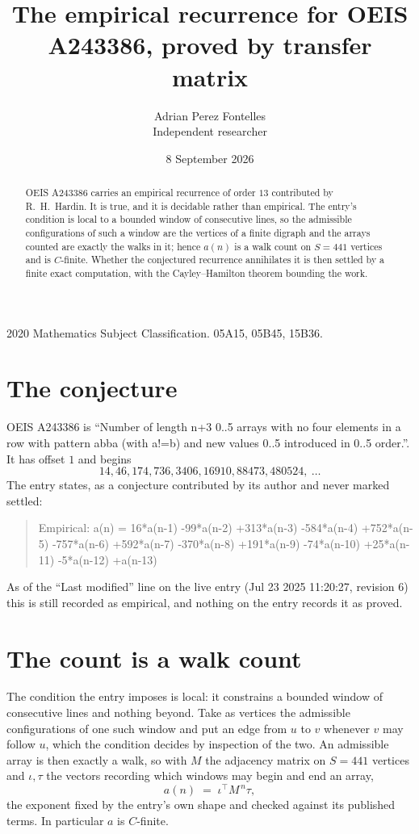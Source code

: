 \documentclass[11pt,a4paper]{article}
\title{The empirical recurrence for OEIS A243386, proved by transfer matrix}
\author{Adrian Perez Fontelles\\ \small Independent researcher}
\date{8 September 2026}
\theoremstyle{plain}
\theoremstyle{definition}
\begin{document}
\maketitle

\begin{abstract}
OEIS A243386 carries an empirical recurrence of order $13$ contributed by R.~H.~Hardin. It is
true, and it is decidable rather than empirical. The entry's condition is local to a bounded window of consecutive lines, so
the admissible configurations of such a window are the vertices of a finite digraph and the
arrays counted are exactly the walks in it; hence $a(n)$ is a walk count on $S=441$ vertices
and is $C$-finite. Whether the conjectured recurrence annihilates it is then settled by a
finite exact computation, with the Cayley--Hamilton theorem bounding the work.
\end{abstract}

\noindent\small 2020 Mathematics Subject Classification. 05A15, 05B45, 15B36.\normalsize

\section{The conjecture}

OEIS A243386 is ``Number of length n+3 0..5 arrays with no four elements in a row with pattern abba (with a!=b) and new values 0..5 introduced in 0..5 order.''. It has offset $1$ and begins
\[
14, 46, 174, 736, 3406, 16910, 88473, 480524,\ \dots
\]
The entry states, as a conjecture contributed by its author and never marked settled:
\begin{quote}
Empirical: a(n) = 16*a(n-1) -99*a(n-2) +313*a(n-3) -584*a(n-4) +752*a(n-5) -757*a(n-6) +592*a(n-7) -370*a(n-8) +191*a(n-9) -74*a(n-10) +25*a(n-11) -5*a(n-12) +a(n-13)
\end{quote}
As of the ``Last modified'' line on the live entry (Jul 23 2025 11:20:27, revision 6) this is still
recorded as empirical, and nothing on the entry records it as proved.

\section{The count is a walk count}

The condition the entry imposes is local: it constrains a bounded window of consecutive lines and nothing beyond. Take as
vertices the admissible configurations of one such window and put an edge from $u$ to $v$
whenever $v$ may follow $u$, which the condition decides by inspection of the two. An
admissible array is then exactly a walk, so with $M$ the adjacency matrix on $S=441$ vertices
and $\iota,\tau$ the vectors recording which windows may begin and end an array,
\[
a(n)\;=\;\iota^{\!\top}M^{\,n}\tau ,
\]
the exponent fixed by the entry's own shape and checked against its published terms. In
particular $a$ is $C$-finite.
\end{document}
